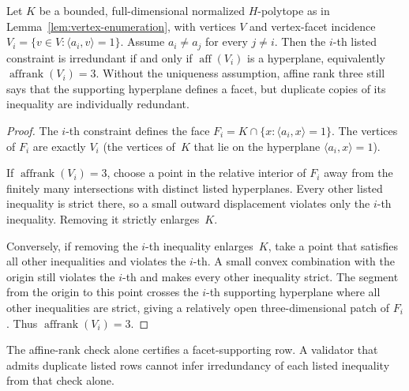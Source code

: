 \begin{unverified}
\begin{lemma}\label{lem:irredundancy}
Let $K$ be a bounded, full-dimensional normalized $H$-polytope as in
Lemma~\ref{lem:vertex-enumeration}, with vertices $V$ and vertex-facet incidence
$V_i = \{v \in V : \langle a_i, v \rangle = 1\}$.
Assume $a_i\ne a_j$ for every $j\ne i$.  Then the $i$-th listed constraint
is irredundant if and only if
$\operatorname{aff}(V_i)$ is a hyperplane, equivalently
$\operatorname{affrank}(V_i) = 3$.
Without the uniqueness assumption, affine rank three still says that the
supporting hyperplane defines a facet, but duplicate copies of its inequality
are individually redundant.
\end{lemma}

\begin{proof}
The $i$-th constraint defines the face
$F_i = K \cap \{x : \langle a_i, x \rangle = 1\}$.
The vertices of $F_i$ are exactly $V_i$ (the vertices of~$K$ that lie
on the hyperplane $\langle a_i, x \rangle = 1$).

If $\operatorname{affrank}(V_i)=3$, choose a point in the relative interior
of $F_i$ away from the finitely many intersections with distinct listed
hyperplanes.  Every other listed inequality is strict there, so a small
outward displacement violates only the $i$-th inequality.  Removing it
strictly enlarges~$K$.

Conversely, if removing the $i$-th inequality enlarges~$K$, take a point
that satisfies all other inequalities and violates the $i$-th.  A small
convex combination with the origin still violates the $i$-th and makes
every other inequality strict.  The segment from the origin to this point
crosses the $i$-th supporting hyperplane where all other inequalities are
strict, giving a relatively open three-dimensional patch of $F_i$.  Thus
$\operatorname{affrank}(V_i)=3$.
\end{proof}
\end{unverified}

The affine-rank check alone certifies a facet-supporting row.  A validator
that admits duplicate listed rows cannot infer irredundancy of each listed
inequality from that check alone.


